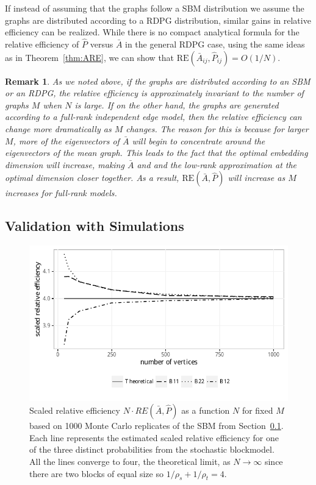 \documentclass[10pt,letterpaper]{article}
\newtheorem{remark}[fact]{Remark}
\begin{document}
If instead of assuming that the graphs follow a SBM distribution we assume the graphs are distributed according to a RDPG distribution, similar gains in relative efficiency can be realized.
While there is no compact analytical formula for the relative efficiency of $\hat{P}$ versus $\bar{A}$ in the general RDPG case, using the same ideas as in Theorem~\ref{thm:ARE}, we can show that $\mathrm{RE}(\bar{A}_{ij},\hat{P}_{ij}) = O(1/N)$.

\begin{remark}
As we noted above, if the graphs are distributed according to an SBM or an RDPG, the relative efficiency is approximately invariant to the number of graphs $M$ when $N$ is large.
If on the other hand, the graphs are generated according to a full-rank independent edge model, then the relative efficiency can change more dramatically as $M$ changes. 
The reason for this is because for larger $M$, more of the eigenvectors of $\bar{A}$ will begin to concentrate around the eigenvectors of the mean graph.
This leads to the fact that the optimal embedding dimension will increase, making $\bar{A}$ and and the low-rank approximation at the optimal dimension closer together. 
As a result, $\mathrm{RE}(\bar{A},\hat{P})$ will increase as $M$ increases for full-rank models.
\end{remark}

\subsection{Validation with Simulations}\label{sec:sbm_sim}


\begin{figure}[!htb]
    \centering
    \includegraphics[width=1\textwidth]{RE.pdf}
    \caption{Scaled relative efficiency $N\cdot RE(\bar{A},\hat{P})$ as a function $N$ for fixed $M$ based on 1000 Monte Carlo replicates of the SBM from Section~\ref{sec:sbm_sim}.
    Each line represents the estimated scaled relative efficiency for one of the three distinct probabilities from the stochastic blockmodel.
    All the lines converge to four, the theoretical limit, as $N\to\infty$ since there are two blocks of equal size so $1/\rho_s+1/\rho_t=4$. }
    \label{fig:RE}
\end{figure}
\end{document}
